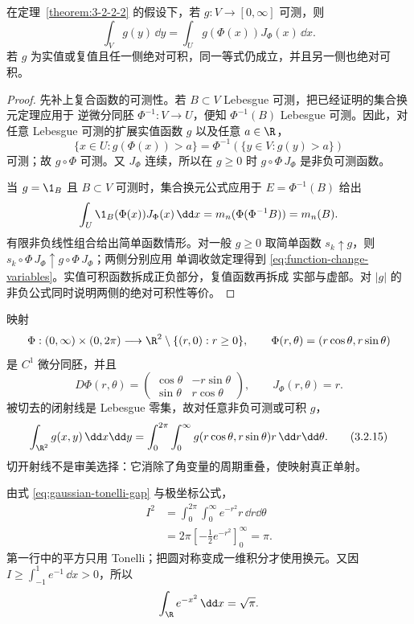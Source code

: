 \begin{theorem}[函数换元公式]\label{theorem:3-2-2-3}
在定理~\ref{theorem:3-2-2-2} 的假设下，若 $g:V\to[0,\infty]$ 可测，则
\[
 \int_Vg(y)\,\dd y
 =\int_Ug(\Phi(x))J_\Phi(x)\,\dd x.
 \tag{3.2.14}\label{eq:function-change-variables}
\]
若 $g$ 为实值或复值且任一侧绝对可积，同一等式仍成立，并且另一侧也绝对可积。
\end{theorem}

\begin{proof}
先补上复合函数的可测性。若 $B\subset V$ Lebesgue 可测，把已经证明的集合换元定理应用于
逆微分同胚 $\Phi^{-1}:V\to U$，便知 $\Phi^{-1}(B)$ Lebesgue 可测。因此，对任意 Lebesgue
可测的扩展实值函数 $g$ 以及任意 $a\in\R$，
\[
 \{x\in U:g(\Phi(x))>a\}
 =\Phi^{-1}(\{y\in V:g(y)>a\})
\]
可测；故 $g\circ\Phi$ 可测。又 $J_\Phi$ 连续，所以在 $g\ge0$ 时
$g\circ\Phi\,J_\Phi$ 是非负可测函数。

当 $g=\1_B$ 且 $B\subset V$ 可测时，集合换元公式应用于
$E=\Phi^{-1}(B)$ 给出
\[
 \int_U\1_B(\Phi(x))J_\Phi(x)\,\dd x
 =m_n(\Phi(\Phi^{-1}B))=m_n(B).
\]
有限非负线性组合给出简单函数情形。对一般 $g\ge0$ 取简单函数
$s_k\uparrow g$，则 $s_k\circ\Phi\,J_\Phi\uparrow g\circ\Phi\,J_\Phi$；两侧分别应用
单调收敛定理得到 \eqref{eq:function-change-variables}。实值可积函数拆成正负部分，复值函数再拆成
实部与虚部。对 $|g|$ 的非负公式同时说明两侧的绝对可积性等价。
\end{proof}

\begin{example}[极坐标]\label{ex:3-2-2-1}
映射
\[
 \Phi:(0,\infty)\times(0,2\pi)\longrightarrow
 \R^2\setminus\{(r,0):r\ge0\},
 \qquad \Phi(r,\theta)=(r\cos\theta,r\sin\theta)
\]
是 $C^1$ 微分同胚，并且
\[
 D\Phi(r,\theta)=
 \begin{pmatrix}
 \cos\theta&-r\sin\theta\\
 \sin\theta&r\cos\theta
 \end{pmatrix},
 \qquad J_\Phi(r,\theta)=r.
\]
被切去的闭射线是 Lebesgue 零集，故对任意非负可测或可积 $g$，
\[
 \int_{\R^2}g(x,y)\,\dd x\dd y
 =\int_0^{2\pi}\int_0^\infty
 g(r\cos\theta,r\sin\theta)r\,\dd r\dd\theta.
 \tag{3.2.15}\label{eq:polar-coordinates}
\]
切开射线不是审美选择：它消除了角变量的周期重叠，使映射真正单射。
\end{example}

\begin{example}[高斯积分的回收]\label{ex:3-2-2-gaussian-recovery}
由式 \eqref{eq:gaussian-tonelli-gap} 与极坐标公式，
\[
 \begin{aligned}
 I^2
 &=\int_0^{2\pi}\int_0^\infty e^{-r^2}r\,\dd r\dd\theta\\
 &=2\pi\left[-\frac12e^{-r^2}\right]_{0}^{\infty}=\pi.
 \end{aligned}
\]
第一行中的平方只用 Tonelli；把圆对称变成一维积分才使用换元。又因
$I\ge\int_{-1}^1e^{-1}\,\dd x>0$，所以
\[
 \int_\R e^{-x^2}\,\dd x=\sqrt\pi.
\]
\end{example}

